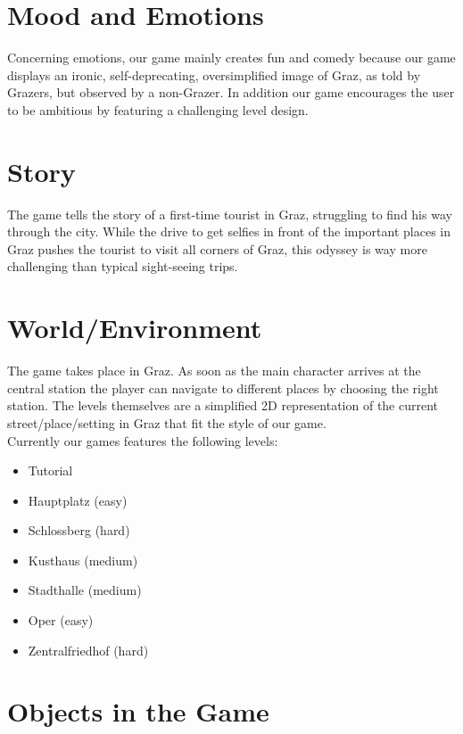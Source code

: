 \documentclass[a4paper]{scrreprt}
\begin{document}
\section{Mood and Emotions}

Concerning emotions, our game mainly creates fun and comedy because our game displays an ironic, self-deprecating, oversimplified image of Graz, as told by Grazers, but observed by a non-Grazer. In addition our game encourages the user to be ambitious by featuring a challenging level design.

\section{Story}

The game tells the story of a first-time tourist in Graz, struggling to find his way through the city. While the drive to get selfies in front of the important places in Graz pushes the tourist to visit all corners of Graz, this odyssey is way more challenging than typical sight-seeing trips.

\section{World/Environment}

The game takes place in Graz. As soon as the main character arrives at the central station the player can navigate to different places by choosing the right station. The levels themselves are a simplified 2D representation of the current street/place/setting in Graz that fit the style of our game. \\

\noindent Currently our games features the following levels:
\begin{itemize}
    \item Tutorial
    \item Hauptplatz (easy)
    \item Schlossberg (hard)
    \item Kusthaus (medium)
    \item Stadthalle (medium)
    \item Oper (easy)
    \item Zentralfriedhof (hard)
    
\end{itemize}

\section{Objects in the Game}
\end{document}
